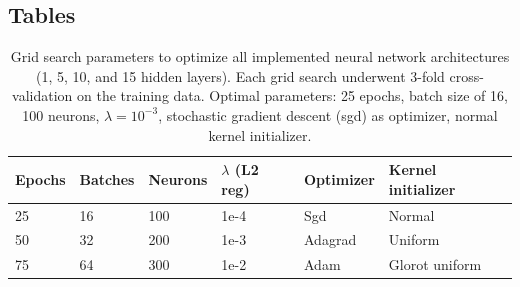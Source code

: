 \documentclass[10pt, letterpaper]{article}
\begin{document}
\subsection*{Tables}
\begin{table}[!ht]
    \caption{Grid search parameters to optimize all implemented neural network architectures (1, 5, 10, and 15 hidden layers). Each grid search underwent 3-fold cross-validation on the training data. Optimal parameters: 25 epochs, batch size of 16, 100 neurons, $\lambda=10^{-3}$, stochastic gradient descent (sgd) as optimizer, normal kernel initializer.}
    \centering
    \label{tab:params}
    \begin{tabular}{l l l l l l}
        \toprule
        Epochs & Batches & Neurons & $\lambda$ (L2 reg) & Optimizer & Kernel initializer \\
        \midrule
        25 & 16 & 100 & 1e-4 & Sgd & Normal \\
        50 & 32 & 200 & 1e-3 & Adagrad & Uniform \\
        75 & 64 & 300 & 1e-2 & Adam & Glorot uniform \\
        \bottomrule
    \end{tabular}
\end{table}
\end{document}
